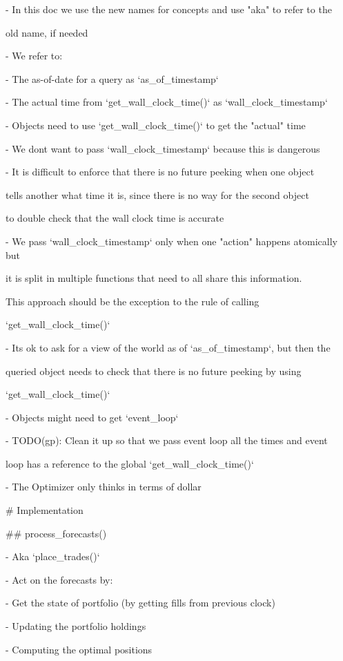 \documentclass[11pt, reqno]{amsart}
\begin{document}
- In this doc we use the new names for concepts and use "aka" to refer
to the

old name, if needed

- We refer to:

- The as-of-date for a query as `as\_of\_timestamp`

- The actual time from `get\_wall\_clock\_time()` as
`wall\_clock\_timestamp`

- Objects need to use `get\_wall\_clock\_time()` to get the "actual"
time

- We don\textquotesingle t want to pass `wall\_clock\_timestamp` because
this is dangerous

- It is difficult to enforce that there is no future peeking when one
object

tells another what time it is, since there is no way for the second
object

to double check that the wall clock time is accurate

- We pass `wall\_clock\_timestamp` only when one "action" happens
atomically but

it is split in multiple functions that need to all share this
information.

This approach should be the exception to the rule of calling

`get\_wall\_clock\_time()`

- It\textquotesingle s ok to ask for a view of the world as of
`as\_of\_timestamp`, but then the

queried object needs to check that there is no future peeking by using

`get\_wall\_clock\_time()`

- Objects might need to get `event\_loop`

- TODO(gp): Clean it up so that we pass event loop all the times and
event

loop has a reference to the global `get\_wall\_clock\_time()`

- The Optimizer only thinks in terms of dollar

\# Implementation

\#\# process\_forecasts()

- Aka `place\_trades()`

- Act on the forecasts by:

- Get the state of portfolio (by getting fills from previous clock)

- Updating the portfolio holdings

- Computing the optimal positions
\end{document}
